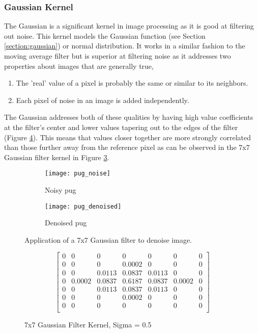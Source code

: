 \subsubsection{Gaussian Kernel}
\label{subsubsection:gauss_kernel}
The Gaussian is a significant kernel in image processing as it is good at filtering out noise. This kernel models the Gaussian function (see Section \ref{section:gaussian}) or normal distribution. It works in a similar fashion to the moving average filter but is superior at filtering noise as it addresses two properties about images that are generally true, 

\begin{enumerate}
    \item The 'real' value of a pixel is probably the same or similar to its neighbors. 
    \item Each pixel of noise in an image is added independently.
\end{enumerate}

The Gaussian addresses both of these qualities by having high value coefficients at the filter's center and lower values tapering out to the edges of the filter (Figure \ref{fig:gauss_kernel}). This means that values closer together are more strongly correlated than those further away from the reference pixel as can be observed in the 7x7 Gaussian filter kernel in Figure \ref{fig:pug_noise}.

\begin{figure}[H]
    \centering
    \begin{subfigure}[b]{0.3\textwidth}
        \texttt{[image: pug\_noise]}
        \caption{Noisy pug}
        \label{fig:pug_noise}
    \end{subfigure}
    \begin{subfigure}[b]{0.3\textwidth}
        \texttt{[image: pug\_denoised]}
        \caption{Denoised pug}
        \label{fig:pug_denoised}
    \end{subfigure}
    \caption{Application of a 7x7 Gaussian filter to denoise image.}
    \label{fig:pug_noise}
\end{figure}


\begin{figure}[H]
    \centering
    \[
    \begin{bmatrix}
       0 & 0 & 0 & 0 & 0 & 0 & 0 \\
       0 & 0 & 0 & 0.0002 & 0 & 0 & 0 \\
       0 & 0 & 0.0113  & 0.0837 & 0.0113  & 0 & 0 \\
       0 & 0.0002 & 0.0837 & 0.6187 & 0.0837 & 0.0002 & 0 \\
       0 & 0 & 0.0113 & 0.0837 & 0.0113 & 0 & 0 \\
       0 & 0 & 0 & 0.0002 & 0 & 0 & 0 \\
       0 & 0 & 0 & 0 & 0 & 0 & 0 \\
    \end{bmatrix}
    \]
    \caption{7x7 Gaussian Filter Kernel, Sigma = 0.5}
    \label{fig:gauss_kernel}
\end{figure}